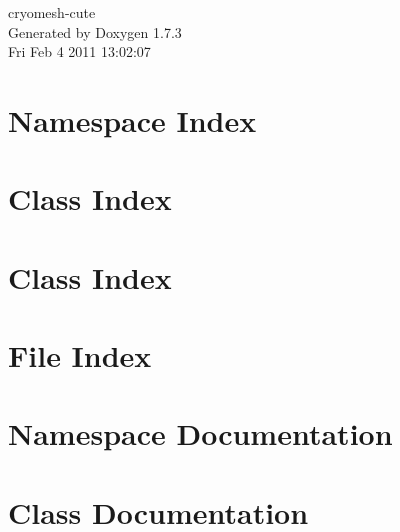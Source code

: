\documentclass[a4paper]{book}
\begin{document}
\hypersetup{pageanchor=false}
\begin{titlepage}
\vspace*{7cm}
\begin{center}
{\Large cryomesh-\/cute }\\
\vspace*{1cm}
{\large Generated by Doxygen 1.7.3}\\
\vspace*{0.5cm}
{\small Fri Feb 4 2011 13:02:07}\\
\end{center}
\end{titlepage}
\clearemptydoublepage
{}
\tableofcontents
\clearemptydoublepage
{}
\hypersetup{pageanchor=true}
\chapter{Namespace Index}

\chapter{Class Index}

\chapter{Class Index}

\chapter{File Index}

\chapter{Namespace Documentation}



\chapter{Class Documentation}













\end{document}
